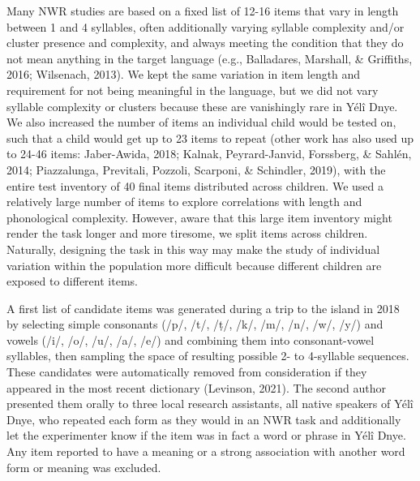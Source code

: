 \documentclass[
  american,
  ,man,floatsintext]{apa6}
\begin{document}
Many NWR studies are based on a fixed list of 12-16 items that vary in length between 1 and 4 syllables, often additionally varying syllable complexity and/or cluster presence and complexity, and always meeting the condition that they do not mean anything in the target language (e.g., Balladares, Marshall, \& Griffiths, 2016; Wilsenach, 2013). We kept the same variation in item length and requirement for not being meaningful in the language, but we did not vary syllable complexity or clusters because these are vanishingly rare in Yélî Dnye. We also increased the number of items an individual child would be tested on, such that a child would get up to 23 items to repeat (other work has also used up to 24-46 items: Jaber-Awida, 2018; Kalnak, Peyrard-Janvid, Forssberg, \& Sahlén, 2014; Piazzalunga, Previtali, Pozzoli, Scarponi, \& Schindler, 2019), with the entire test inventory of 40 final items distributed across children. We used a relatively large number of items to explore correlations with length and phonological complexity. However, aware that this large item inventory might render the task longer and more tiresome, we split items across children. Naturally, designing the task in this way may make the study of individual variation within the population more difficult because different children are exposed to different items.

A first list of candidate items was generated during a trip to the island in 2018 by selecting simple consonants (/p/, /t/, /ṭ/, /k/, /m/, /n/, /w/, /y/) and vowels (/i/, /o/, /u/, /a/, /e/) and combining them into consonant-vowel syllables, then sampling the space of resulting possible 2- to 4-syllable sequences. These candidates were automatically removed from consideration if they appeared in the most recent dictionary (Levinson, 2021). The second author presented them orally to three local research assistants, all native speakers of Yélî Dnye, who repeated each form as they would in an NWR task and additionally let the experimenter know if the item was in fact a word or phrase in Yélî Dnye. Any item reported to have a meaning or a strong association with another word form or meaning was excluded.
\end{document}
